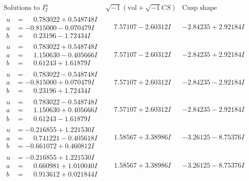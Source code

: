 \documentclass[1p]{elsarticle_modified}
\theoremstyle{definition}
\newcommand{\I}{\sqrt{-1}}
\begin{document}
$$\begin{array}{c|c|c}  
\text{Solutions to }I^u_{2}& \I (\text{vol} + \sqrt{-1}CS) & \text{Cusp shape}\\
 \hline 
\begin{aligned}
u &= \phantom{-}0.783022 + 0.548748 I \\
a &= -0.815000 - 0.070479 I \\
b &= \phantom{-}0.23196 - 1.72434 I\end{aligned}
 & \phantom{-}7.57107 - 2.60312 I & -2.84235 + 2.92184 I \\ \hline\begin{aligned}
u &= \phantom{-}0.783022 + 0.548748 I \\
a &= \phantom{-}1.150630 - 0.405666 I \\
b &= \phantom{-}0.61243 + 1.61879 I\end{aligned}
 & \phantom{-}7.57107 - 2.60312 I & -2.84235 + 2.92184 I \\ \hline\begin{aligned}
u &= \phantom{-}0.783022 - 0.548748 I \\
a &= -0.815000 + 0.070479 I \\
b &= \phantom{-}0.23196 + 1.72434 I\end{aligned}
 & \phantom{-}7.57107 + 2.60312 I & -2.84235 - 2.92184 I \\ \hline\begin{aligned}
u &= \phantom{-}0.783022 - 0.548748 I \\
a &= \phantom{-}1.150630 + 0.405666 I \\
b &= \phantom{-}0.61243 - 1.61879 I\end{aligned}
 & \phantom{-}7.57107 + 2.60312 I & -2.84235 - 2.92184 I \\ \hline\begin{aligned}
u &= -0.216855 + 1.221530 I \\
a &= \phantom{-}0.741221 - 0.405618 I \\
b &= -0.661072 + 0.460812 I\end{aligned}
 & \phantom{-}1.58567 + 3.38986 I & -3.26125 - 8.75376 I \\ \hline\begin{aligned}
u &= -0.216855 + 1.221530 I \\
a &= \phantom{-}0.660981 + 1.010040 I \\
b &= \phantom{-}0.913612 + 0.021844 I\end{aligned}
 & \phantom{-}1.58567 + 3.38986 I & -3.26125 - 8.75376 I \\ \hline\begin{aligned}

\end{aligned}
\end{array}$$
\end{document}
